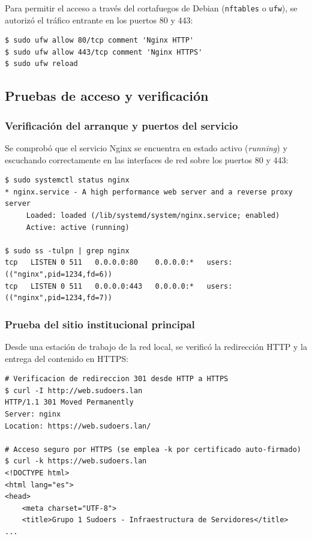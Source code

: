 Para permitir el acceso a través del cortafuegos de Debian (\texttt{nftables} o
\texttt{ufw}), se autorizó el tráfico entrante en los puertos 80 y 443:

\begin{lstlisting}[style=terminal]
$ sudo ufw allow 80/tcp comment 'Nginx HTTP'
$ sudo ufw allow 443/tcp comment 'Nginx HTTPS'
$ sudo ufw reload
\end{lstlisting}

\subsection{Pruebas de acceso y verificación}

\subsubsection{Verificación del arranque y puertos del servicio}

Se comprobó que el servicio Nginx se encuentra en estado activo (\textit{running})
y escuchando correctamente en las interfaces de red sobre los puertos 80 y 443:

\begin{lstlisting}[style=terminal]
$ sudo systemctl status nginx
* nginx.service - A high performance web server and a reverse proxy server
     Loaded: loaded (/lib/systemd/system/nginx.service; enabled)
     Active: active (running)

$ sudo ss -tulpn | grep nginx
tcp   LISTEN 0 511   0.0.0.0:80    0.0.0.0:*   users:(("nginx",pid=1234,fd=6))
tcp   LISTEN 0 511   0.0.0.0:443   0.0.0.0:*   users:(("nginx",pid=1234,fd=7))
\end{lstlisting}


\subsubsection{Prueba del sitio institucional principal}

Desde una estación de trabajo de la red local, se verificó la redirección HTTP y
la entrega del contenido en HTTPS:

\begin{lstlisting}[style=terminal]
# Verificacion de redireccion 301 desde HTTP a HTTPS
$ curl -I http://web.sudoers.lan
HTTP/1.1 301 Moved Permanently
Server: nginx
Location: https://web.sudoers.lan/

# Acceso seguro por HTTPS (se emplea -k por certificado auto-firmado)
$ curl -k https://web.sudoers.lan
<!DOCTYPE html>
<html lang="es">
<head>
    <meta charset="UTF-8">
    <title>Grupo 1 Sudoers - Infraestructura de Servidores</title>
...
\end{lstlisting}

